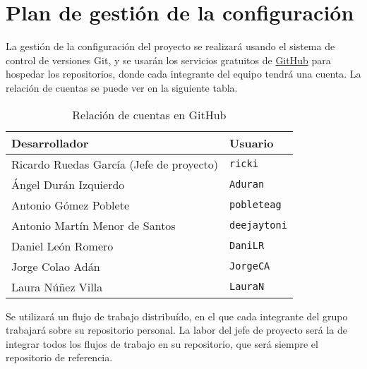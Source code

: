 \section{Plan de gestión de la configuración}

La gestión de la configuración del proyecto se realizará usando el
sistema de control de versiones Git, y se usarán los servicios gratuitos de
\href{http://github.com}{GitHub} para hospedar los repositorios, donde cada
integrante del equipo tendrá una cuenta. La relación de cuentas se puede ver en
la siguiente tabla.

\begin{longtable}[c]{ll}
\caption{Relación de cuentas en GitHub} \\
\textbf{Desarrollador} & \textbf{Usuario} \\
\hline \hline
\endhead
Ricardo Ruedas García (Jefe de proyecto) & \texttt{ricki} \\
\hline
Ángel Durán Izquierdo & \texttt{Aduran} \\
Antonio Gómez Poblete & \texttt{pobleteag} \\
Antonio Martín Menor de Santos & \texttt{deejaytoni} \\
Daniel León Romero & \texttt{DaniLR} \\
Jorge Colao Adán & \texttt{JorgeCA} \\
Laura Núñez Villa & \texttt{LauraN} \\
\hline
\end{longtable}

Se utilizará un flujo de trabajo distribuído, en el que cada integrante del
grupo trabajará sobre su repositorio personal. La labor del jefe de proyecto
será la de integrar todos los flujos de trabajo en su repositorio, que será
siempre el repositorio de referencia.
